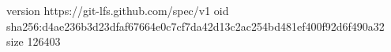 version https://git-lfs.github.com/spec/v1
oid sha256:d4ae236b3d23dfaf67664e0c7cf7da42d13c2ac254bd481ef400f92d6f490a32
size 126403
